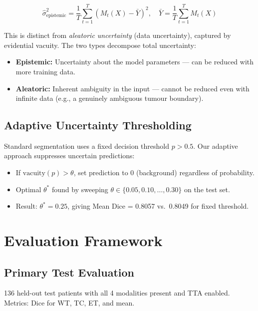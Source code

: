\documentclass[12pt,a4paper]{article}
\begin{document}
\[
\hat{\sigma}^2_{\text{epistemic}} = \frac{1}{T}\sum_{t=1}^{T}(M_t(X) - \bar{Y})^2, \quad \bar{Y} = \frac{1}{T}\sum_{t=1}^{T} M_t(X)
\]

This is distinct from \emph{aleatoric uncertainty} (data uncertainty), captured by evidential vacuity. The two types decompose total uncertainty:

\begin{itemize}[noitemsep]
  \item \textbf{Epistemic:} Uncertainty about the model parameters --- can be reduced with more training data.
  \item \textbf{Aleatoric:} Inherent ambiguity in the input --- cannot be reduced even with infinite data (e.g., a genuinely ambiguous tumour boundary).
\end{itemize}

\subsection{Adaptive Uncertainty Thresholding}

Standard segmentation uses a fixed decision threshold $p > 0.5$. Our adaptive approach suppresses uncertain predictions:

\begin{itemize}[noitemsep]
  \item If $\text{vacuity}(p) > \theta$, set prediction to 0 (background) regardless of probability.
  \item Optimal $\theta^*$ found by sweeping $\theta \in \{0.05, 0.10, \ldots, 0.30\}$ on the test set.
  \item Result: $\theta^* = 0.25$, giving Mean Dice = 0.8057 vs.\ 0.8049 for fixed threshold.
\end{itemize}

\section{Evaluation Framework}

\subsection{Primary Test Evaluation}

136 held-out test patients with all 4 modalities present and TTA enabled. Metrics: Dice for WT, TC, ET, and mean.
\end{document}
